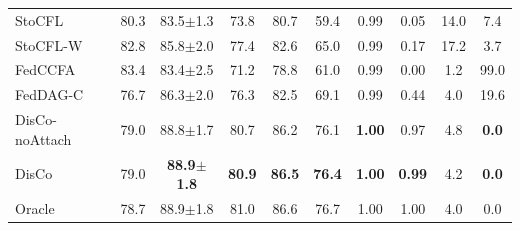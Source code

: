 \begin{tabular}{lccccccccc}
StoCFL & 80.3 & 83.5$\pm$1.3 & 73.8 & 80.7 & 59.4 & 0.99 & 0.05 & 14.0 & 7.4 \\
StoCFL-W & 82.8 & 85.8$\pm$2.0 & 77.4 & 82.6 & 65.0 & 0.99 & 0.17 & 17.2 & 3.7 \\
FedCCFA & 83.4 & 83.4$\pm$2.5 & 71.2 & 78.8 & 61.0 & 0.99 & 0.00 & 1.2 & 99.0 \\
FedDAG-C & 76.7 & 86.3$\pm$2.0 & 76.3 & 82.5 & 69.1 & 0.99 & 0.44 & 4.0 & 19.6 \\
DisCo-noAttach & 79.0 & 88.8$\pm$1.7 & 80.7 & 86.2 & 76.1 & \textbf{1.00} & 0.97 & 4.8 & \textbf{0.0} \\
DisCo & 79.0 & \textbf{88.9$\pm$1.8} & \textbf{80.9} & \textbf{86.5} & \textbf{76.4} & \textbf{1.00} & \textbf{0.99} & 4.2 & \textbf{0.0} \\
Oracle & 78.7 & 88.9$\pm$1.8 & 81.0 & 86.6 & 76.7 & 1.00 & 1.00 & 4.0 & 0.0 \\
\bottomrule
\end{tabular}
